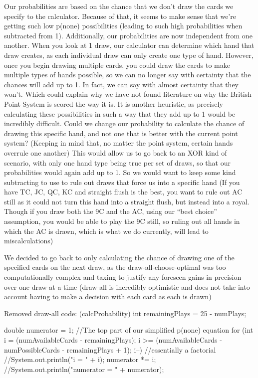 \documentclass[letterpaper]{article}
\begin{document}
	Our probabilities are based on the chance that we don’t draw the cards we specify to the calculator. Because of that, it seems to make sense that we’re getting such low p(none) possibilities (leading to such high probabilities when subtracted from 1). Additionally, our probabilities are now independent from one another. When you look at 1 draw, our calculator can determine which hand that draw creates, as each individual draw can only create one type of hand. However, once you begin drawing multiple cards, you could draw the cards to make multiple types of hands possible, so we can no longer say with certainty that the chances will add up to 1. In fact, we can say with almost certainty that they won’t. Which could explain why we have not found literature on why the British Point System is scored the way it is. It is another heuristic, as precisely calculating these possibilities in such a way that they add up to 1 would be incredibly difficult. 
Could we change our probability to calculate the chance of drawing this specific hand, and not one that is better with the current point system? (Keeping in mind that, no matter the point system, certain hands overrule one another) This would allow us to go back to an XOR kind of scenario, with only one hand type being true per set of draws, so that our probabilities would again add up to 1.
So we would want to keep some kind subtracting to use to rule out draws that force us into a specific hand (If you have TC, JC, QC, KC and straight flush is the best, you want to rule out AC still as it could not turn this hand into a straight flush, but instead into a royal. Though if you draw both the 9C and the AC, using our “best choice” assumption, you would be able to play the 9C still, so ruling out all hands in which the AC is drawn, which is what we do currently, will lead to miscalculations)

We decided to go back to only calculating the chance of drawing one of the specified cards on the next draw, as the draw-all-choose-optimal was too computationally complex and taxing to justify any foreseen gains in precision over one-draw-at-a-time (draw-all is incredibly optimistic and does not take into account having to make a decision with each card as each is drawn)

Removed draw-all code: (calcProbability)
int remainingPlays = 25 - numPlays;
		
double numerator = 1; //The top part of our simplified p(none) equation
for (int i = (numAvailableCards - remainingPlays); i >= (numAvailableCards - numPossibleCards - remainingPlays + 1); i--) {//essentially a factorial
//System.out.println("i = " + i);
numerator *= i;
}
//System.out.println("numerator = " + numerator);	
\end{document}
